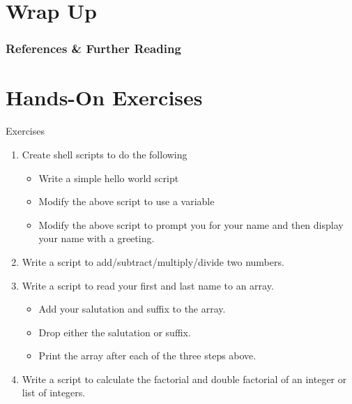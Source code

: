 \documentclass[10pt,t]{beamer}
\begin{document}
\section{Wrap Up}
\begin{frame}
  \frametitle{References \& Further Reading}
  \begin{itemize}
    \fontsize{7}{9}
  \end{itemize}
\end{frame}

\section{Hands-On Exercises}
\begin{frame}{Exercises}
  \begin{enumerate}
    \item Create shell scripts to do the following
    \begin{itemize}
        \item Write a simple hello world script
        \item Modify the above script to use a variable
        \item Modify the above script to prompt you for your name and then display your name with a greeting.
    \end{itemize}
    \item Write a script to add/subtract/multiply/divide two numbers.
    \item Write a script to read your first and last name to an array.
    \begin{itemize}
      \item Add your salutation and suffix to the array.
      \item Drop either the salutation or suffix.
      \item Print the array after each of the three steps above.
    \end{itemize}
    \item Write a script to calculate the factorial and double factorial of an integer or list of integers.
  \end{enumerate}
\end{frame}
\end{document}
